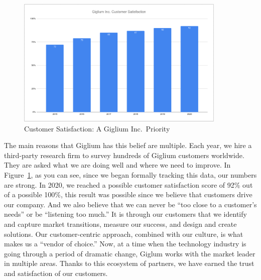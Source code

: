 \begin{figure}[ht!]
	\centering
	\includegraphics[width=100mm]{./img/introduction/customer-satisfaction-graph.png}
	\caption{Customer Satisfaction: A Giglium Inc.\ Priority}\label{fig:customer-satisfaction}
\end{figure}

\clearpage
The main reasons that Giglium has this belief are multiple. Each year, we hire a third-party research firm to survey hundreds of Giglium customers
worldwide. They are asked what we are doing well and where we need to improve. In Figure~\ref{fig:customer-satisfaction}, as you can see, since we began formally tracking this data, our numbers are strong. In 2020, we reached a possible customer satisfaction score of 92\% out of a possible 100\%, this result was possible since we believe that customers drive our company. And we also believe that we can never be “too close to a customer's needs” or be “listening too much.” It is through our customers that we identify and capture market transitions, measure our success, and design and create solutions. Our customer-centric approach, combined with our culture, is what makes us a “vendor of choice.” Now, at a time when the technology industry is going through a period of dramatic change, Giglum works with the market leader in multiple areas. 
Thanks to this ecosystem of partners, we have earned the trust and satisfaction of our
customers.  

